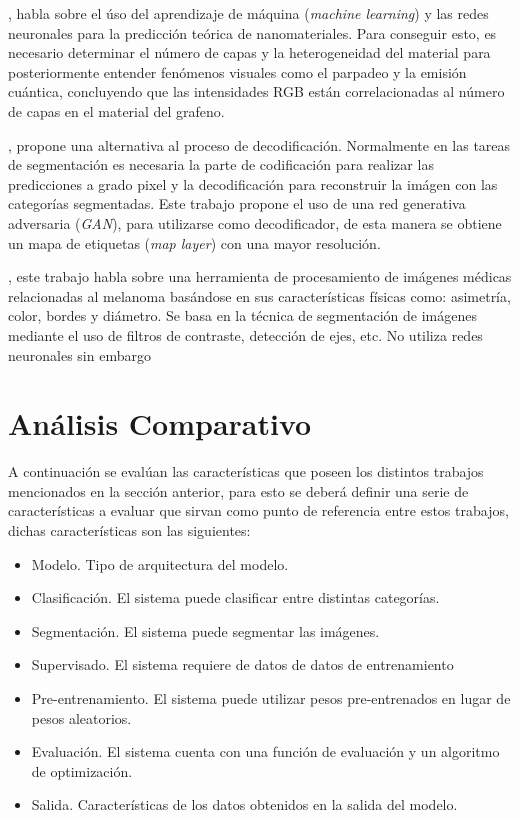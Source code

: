 \citet{zhou2019emerging}, habla sobre el úso del aprendizaje de máquina (\emph{machine learning}) y las redes neuronales para la predicción teórica de nanomateriales. Para conseguir esto, es necesario determinar el número de capas y la heterogeneidad del material para posteriormente entender fenómenos visuales como el parpadeo y la emisión cuántica, concluyendo que las intensidades RGB están correlacionadas al número de capas en el material del grafeno. 


\citet{DBLP:journals/corr/LucCCV16}, propone una alternativa al proceso de decodificación. Normalmente en las tareas de segmentación es necesaria la parte de codificación para realizar las predicciones a grado pixel y la decodificación para reconstruir la imágen con las categorías segmentadas. Este trabajo propone el uso de una red generativa adversaria (\emph{GAN}), para utilizarse como decodificador, de esta manera se obtiene un mapa de etiquetas (\emph{map layer}) con una mayor resolución.

\citet{JAIN2015735}, este trabajo habla sobre una herramienta de procesamiento de imágenes médicas relacionadas al melanoma basándose en sus características físicas como: asimetría, color, bordes y diámetro. Se basa en la técnica de segmentación de imágenes mediante el uso de filtros de contraste, detección de ejes, etc. No utiliza redes neuronales sin embargo 


\section{Análisis Comparativo}
A continuación se evalúan las características que poseen los distintos trabajos mencionados en la sección anterior, para esto se deberá definir una serie de características a evaluar que sirvan como punto de referencia entre estos trabajos, dichas características son las siguientes:

\begin{itemize}
    \item Modelo. Tipo de arquitectura del modelo.
    \item Clasificación. El sistema puede clasificar entre distintas categorías.
    \item Segmentación. El sistema puede segmentar las imágenes.
    \item Supervisado. El sistema requiere de datos de datos de entrenamiento 
    \item Pre-entrenamiento. El sistema puede utilizar pesos pre-entrenados en lugar de pesos aleatorios.
    \item Evaluación. El sistema cuenta con una función de evaluación y un algoritmo de optimización.
    \item Salida. Características de los datos obtenidos en la salida del modelo.
\end{itemize}


